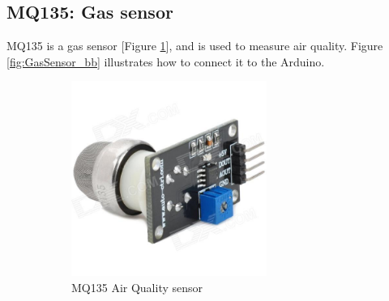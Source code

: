 \documentclass[12pt, a4paper,twoside]{tesi_upf}
\begin{document}
    \subsection{MQ135: Gas sensor}
      MQ135 is a gas sensor [Figure \ref{fig:MQ135}], and is used to measure air quality. Figure \ref{fig:GasSensor_bb} illustrates how to connect it to the Arduino.      
      \begin{figure}
        \centering
        \begin{subfigure}[b]{0.3\textwidth}
                \includegraphics[width=0.7\textwidth]{./Figures/mq135.jpg}
                \caption{MQ135 Air Quality sensor}
                \label{fig:MQ135}
        \end{subfigure}%
        ~ %
        \begin{subfigure}[b]{0.3\textwidth}

\end{subfigure}
\end{figure}
\end{document}
